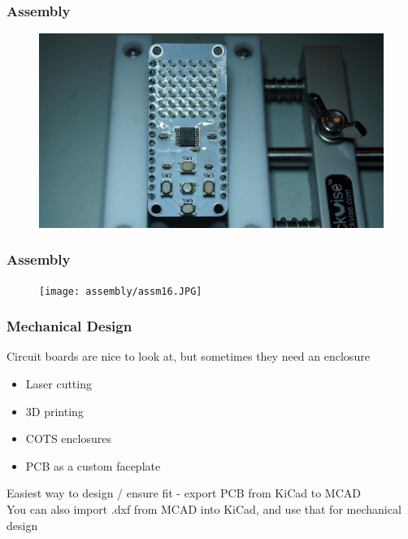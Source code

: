 \documentclass[t]{beamer}
\begin{document}
\begin{frame}
\frametitle{Assembly}
\begin{figure}
	\includegraphics[width=\linewidth]{assembly/assm15.JPG}
\end{figure}
\end{frame}
\begin{frame}
\frametitle{Assembly}
\begin{figure}
	\texttt{[image: assembly/assm16.JPG]}
\end{figure}
\end{frame}
\begin{frame}
\frametitle{Mechanical Design}
Circuit boards are nice to look at, but sometimes they need an enclosure
\begin{itemize}
	\item Laser cutting
	\item 3D printing
	\item COTS enclosures
	\item PCB as a custom faceplate
\end{itemize}
\vspace{10pt}
Easiest way to design / ensure fit - export PCB from KiCad to MCAD\\[10pt]
You can also import .dxf from MCAD into KiCad, and use that for mechanical design
\end{frame}
\end{document}
